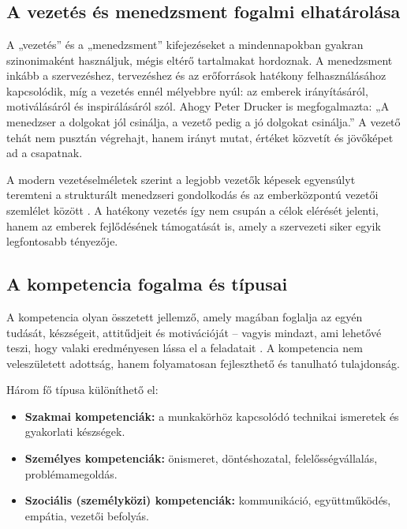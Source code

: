\chapter{\Literature}
\section{A vezetés és menedzsment fogalmi elhatárolása}

A „vezetés” és a „menedzsment” kifejezéseket a mindennapokban gyakran szinonimaként használjuk, 
mégis eltérő tartalmakat hordoznak. 
A menedzsment inkább a szervezéshez, tervezéshez és az erőforrások hatékony felhasználásához kapcsolódik, 
míg a vezetés ennél mélyebbre nyúl: az emberek irányításáról, motiválásáról és inspirálásáról szól.
Ahogy Peter Drucker is megfogalmazta: 
„A menedzser a dolgokat jól csinálja, a vezető pedig a jó dolgokat csinálja.” \cite{drucker1954}
A vezető tehát nem pusztán végrehajt, hanem irányt mutat, értéket közvetít és jövőképet ad a csapatnak. 

A modern vezetéselméletek szerint a legjobb vezetők képesek egyensúlyt teremteni a strukturált 
menedzseri gondolkodás és az emberközpontú vezetői szemlélet között \cite{mintzberg1975}. 
A hatékony vezetés így nem csupán a célok elérését jelenti, hanem az emberek fejlődésének támogatását is, 
amely a szervezeti siker egyik legfontosabb tényezője.

\section{A kompetencia fogalma és típusai}

A kompetencia olyan összetett jellemző, amely magában foglalja az egyén tudását, 
készségeit, attitűdjeit és motivációját – vagyis mindazt, ami lehetővé teszi, 
hogy valaki eredményesen lássa el a feladatait \cite{spencer1993}. 
A kompetencia nem veleszületett adottság, hanem folyamatosan fejleszthető és tanulható tulajdonság.

Három fő típusa különíthető el:

\begin{itemize}
    \item \textbf{Szakmai kompetenciák:} a munkakörhöz kapcsolódó technikai ismeretek és gyakorlati készségek.
    \item \textbf{Személyes kompetenciák:} önismeret, döntéshozatal, felelősségvállalás, problémamegoldás.
    \item \textbf{Szociális (személyközi) kompetenciák:} kommunikáció, együttműködés, empátia, vezetői befolyás.
\end{itemize}

